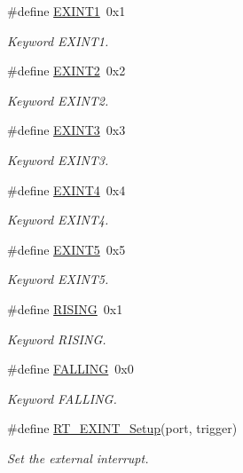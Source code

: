 \begin{DoxyCompactItemize}
\#define \mbox{\hyperlink{a00011_a1ea7d6796165b98f1bc6bf6fe841c3d9}{E\+X\+I\+N\+T1}}~0x1
\begin{DoxyCompactList}\small\item\em Keyword E\+X\+I\+N\+T1. \end{DoxyCompactList}\item 
\#define \mbox{\hyperlink{a00011_ac959f4d8aed4e04e25c966e6c8315431}{E\+X\+I\+N\+T2}}~0x2
\begin{DoxyCompactList}\small\item\em Keyword E\+X\+I\+N\+T2. \end{DoxyCompactList}\item 
\#define \mbox{\hyperlink{a00011_ae8428c0cbd7362b90ea048bcf59aef2c}{E\+X\+I\+N\+T3}}~0x3
\begin{DoxyCompactList}\small\item\em Keyword E\+X\+I\+N\+T3. \end{DoxyCompactList}\item 
\#define \mbox{\hyperlink{a00011_a719b5fa27b5469e1fe2844e9930fa249}{E\+X\+I\+N\+T4}}~0x4
\begin{DoxyCompactList}\small\item\em Keyword E\+X\+I\+N\+T4. \end{DoxyCompactList}\item 
\#define \mbox{\hyperlink{a00011_a309fb21107f9f6261cd7e7ca9de6c2f2}{E\+X\+I\+N\+T5}}~0x5
\begin{DoxyCompactList}\small\item\em Keyword E\+X\+I\+N\+T5. \end{DoxyCompactList}\item 
\#define \mbox{\hyperlink{a00011_aeea2b49478f3b13faedba764985c6e96}{R\+I\+S\+I\+NG}}~0x1
\begin{DoxyCompactList}\small\item\em Keyword R\+I\+S\+I\+NG. \end{DoxyCompactList}\item 
\#define \mbox{\hyperlink{a00011_ac00eb6fc2047dc399280f31b0c5f4472}{F\+A\+L\+L\+I\+NG}}~0x0
\begin{DoxyCompactList}\small\item\em Keyword F\+A\+L\+L\+I\+NG. \end{DoxyCompactList}\item 
\#define \mbox{\hyperlink{a00011_a32678a4a1877f8e6fcae9fad3dd436ed}{R\+T\+\_\+\+E\+X\+I\+N\+T\+\_\+\+Setup}}(port,  trigger)
\begin{DoxyCompactList}\small\item\em Set the external interrupt. \end{DoxyCompactList}\item 

\end{DoxyCompactItemize}
